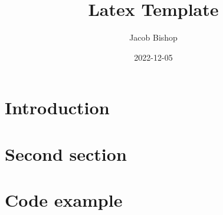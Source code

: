 \documentclass{article}
\title{Latex Template}
\author{Jacob Bishop}
\date{2022-12-05}
\begin{document}
\maketitle

\section{Introduction}



\newpage

\section{Second section}



\newpage

\section{Code example}


\end{document}
